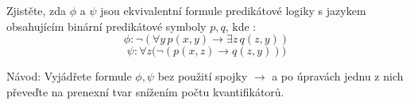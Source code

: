 Zjistěte, zda $\phi$ a $\psi$ jsou ekvivalentní formule predikátové logiky s
jazykem obsahujícím binární predikátové symboly $p,q$, kde : 
$$\phi : \neg (\forall y\, p(x,y) \rightarrow \exists z\, q(z,y))$$
$$\psi : \forall z \bigl ( \neg (p(x,z) \rightarrow q(z,y) ) \bigr)$$

Návod: Vyjádřete formule $\phi,\psi$ bez použití spojky $\rightarrow$ a po
úpravách jednu z nich převeďte na prenexní tvar snížením počtu kvantifikátorů.
